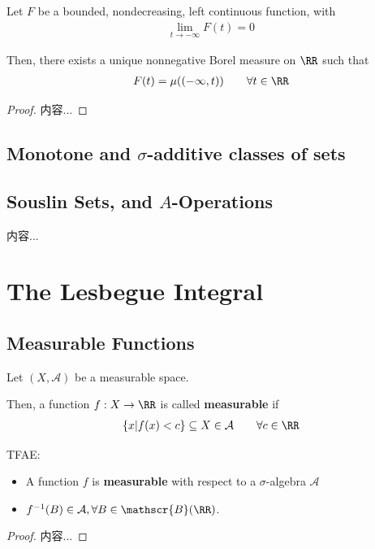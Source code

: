 \documentclass[Total.tex]{subfiles}
\begin{document}
		\begin{theorem}
			Let $F$ be a bounded, nondecreasing, left continuous function, with
			\begin{gather*}
				\lim_{t\rightarrow-\infty} F(t)=0
			\end{gather*}
			
			Then, there exists a unique nonnegative Borel measure on $\RR$ such that
			\begin{gather*}
				F(t)=\mu((-\infty,t))\qquad \forall t\in \RR
			\end{gather*}
		\end{theorem}
		\begin{proof}
			内容...
		\end{proof}
		\section{Monotone and $\sigma$-additive classes of sets}
		
		\section{Souslin Sets, and $A$-Operations}
			\begin{Def}
				内容...
			\end{Def}
		
	\chapter{The Lesbegue Integral}
		\section{Measurable Functions}
			\begin{Def}
				Let $(X,\mathcal{A})$ be a measurable space.
				
				Then, a function $f:X\rightarrow \RR$ is called \textbf{measurable} if
				\begin{gather*}
					\{x|f(x)<c\}\subseteq X\in \mathcal{A}\qquad \forall c\in \RR
				\end{gather*}
			\end{Def}
			
			\begin{proposition}
				TFAE:
				\begin{itemize}
					\item 
					A function $f$ is \textbf{measurable} with respect to a $\sigma$-algebra $\mathcal{A}$ 
					\item $f^{-1}(B)\in \mathcal{A},\forall B\in \mathscr{B}(\RR)$. 
				\end{itemize}
			\end{proposition}
			\begin{proof}
				内容...
			\end{proof}
			
\end{document}
